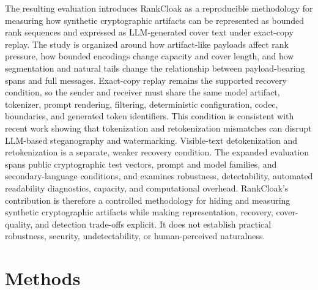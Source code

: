 \documentclass[fleqn,10pt]{wlscirep}
\begin{document}
The resulting evaluation introduces RankCloak as a reproducible methodology for measuring how synthetic cryptographic artifacts can be represented as bounded rank sequences and expressed as LLM-generated cover text under exact-copy replay. The study is organized around how artifact-like payloads affect rank pressure, how bounded encodings change capacity and cover length, and how segmentation and natural tails change the relationship between payload-bearing spans and full messages. Exact-copy replay remains the supported recovery condition, so the sender and receiver must share the same model artifact, tokenizer, prompt rendering, filtering, deterministic configuration, codec, boundaries, and generated token identifiers. This condition is consistent with recent work showing that tokenization and retokenization mismatches can disrupt LLM-based steganography and watermarking\cite{YanMurawaki2025TokenizationInconsistency}. Visible-text detokenization and retokenization is a separate, weaker recovery condition. The expanded evaluation spans public cryptographic test vectors, prompt and model families, and secondary-language conditions, and examines robustness, detectability, automated readability diagnostics, capacity, and computational overhead. RankCloak's contribution is therefore a controlled methodology for hiding and measuring synthetic cryptographic artifacts while making representation, recovery, cover-quality, and detection trade-offs explicit. It does not establish practical robustness, security, undetectability, or human-perceived naturalness.




\section*{Methods}\label{sec:methods}
\end{document}

